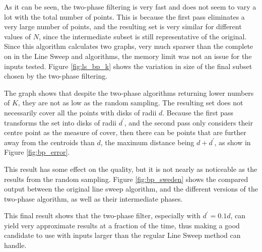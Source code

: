 

As it can be seen, the two-phase filtering is very fast and does not seem to vary a lot with the total number of points. This is because the first pass eliminates a very large number of points, and the resulting set is very similar for different values of $N$, since the intermediate subset is still representative of the original. Since this algorithm calculates two graphs, very much sparser than the complete on in the Line Sweep and \kdtree algorithms, the memory limit was not an issue for the inputs tested. Figure \ref{fig:ls_bp_k} shows the variation in size of the final subset chosen by the two-phase filtering.



The graph shows that despite the two-phase algorithms returning lower numbers of $K$, they are not as low as the random sampling. The resulting set does not necessarily cover all the points with disks of radii $d$. Because the first pass transforms the set into disks of radii $d^\prime$, and the second pass only considers their centre point as the measure of cover, then there can be points that are further away from the centroids than $d$, the maximum distance being $d+d^\prime$, as show in Figure \ref{fig:bp_error}.



This result has some effect on the quality, but it is not nearly as noticeable as the results from the random sampling. Figure \ref{fig:bp_sweden} shows the compared output between the original line sweep algorithm, and the different versions of the two-phase algorithm, as well as their intermediate phases.


This final result shows that the two-phase filter, especially with $d^\prime=0.1d$, can yield very approximate results at a fraction of the time, thus making a good candidate to use with inputs larger than the regular Line Sweep method can handle.



